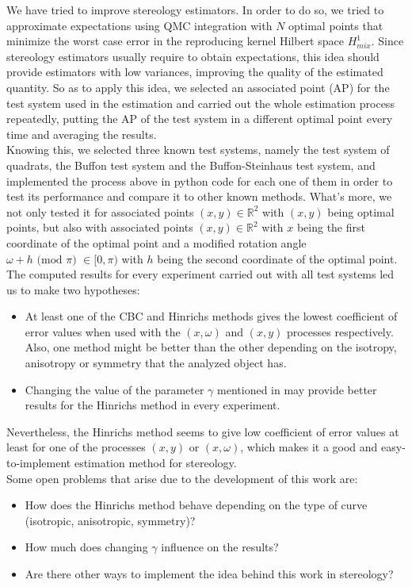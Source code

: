 
We have tried to improve stereology estimators. In order to do so, we tried to approximate expectations using QMC integration with $N$ optimal points that minimize the worst case error in the reproducing kernel Hilbert space $H_{mix}^1$. Since stereology estimators usually require to obtain expectations, this idea should provide estimators with low variances, improving the quality of the estimated quantity. So as to apply this idea, we selected an associated point (AP) for the test system used in the estimation and carried out the whole estimation process repeatedly, putting the AP of the test system in a different optimal point every time and averaging the results.\\


Knowing this, we selected three known test systems, namely the test system of quadrats, the Buffon test system and the Buffon-Steinhaus test system, and implemented the process above in python code for each one of them in order to test its performance and compare it to other known methods. What's more, we not only tested it for associated points $(x,y) \in \mathbb{R}^2$ with $(x,y)$ being optimal points, but also with associated points $(x,y) \in \mathbb{R}^2$ with $x$ being the first coordinate of the optimal point and a modified rotation angle $\omega + h \text{ (mod $\pi$) } \in [0,\pi)$ with $h$ being the second coordinate of the optimal point.\\


The computed results for every experiment carried out with all test systems led us to make two hypotheses: 
\begin{itemize}
    \item At least one of the CBC and Hinrichs methods gives the lowest coefficient of error values when used with the $(x,\omega)$ and $(x,y)$ processes respectively. Also, one method might be better than the other depending on the isotropy, anisotropy or symmetry that the analyzed object has.
    \item Changing the value of the parameter $\gamma$ mentioned in \cite{Hinrichs.pdf} may provide better results for the Hinrichs method in every experiment.
\end{itemize}


Nevertheless, the Hinrichs method seems to give low coefficient of error values at least for one of the processes $(x,y)$ or $(x,\omega)$, which makes it a good and easy-to-implement estimation method for stereology.\\


Some open problems that arise due to the development of this work are:
\begin{itemize}
    \item How does the Hinrichs method behave depending on the type of curve (isotropic, anisotropic, symmetry)?
    \item How much does changing $\gamma$ influence on the results?
    \item Are there other ways to implement the idea behind this work in stereology?
\end{itemize}






